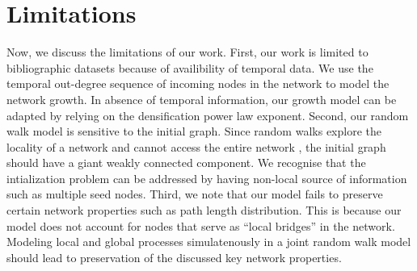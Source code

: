 
%
%
%

\section{Limitations}
Now, we discuss the limitations of our work. First, our work is limited to
bibliographic datasets because of availibility of temporal data. We use the
temporal out-degree sequence of incoming nodes in the network to model the
network growth. In absence of temporal information, our growth model can be
adapted by relying on the densification power law exponent. Second, our random
walk model is sensitive to the initial graph. Since random walks explore the
locality of a network and cannot access the entire network , the initial graph
should have a giant weakly connected component. We recognise that the
intialization problem can be addressed by having non-local source of information
such as multiple seed nodes. Third, we note that our model fails to preserve
certain network properties such as path length distribution. This is because
our model does not account for nodes that serve as ``local bridges'' in the network.
Modeling local and global processes simulatenously in a joint random walk model
should lead to preservation of the discussed key network properties.
